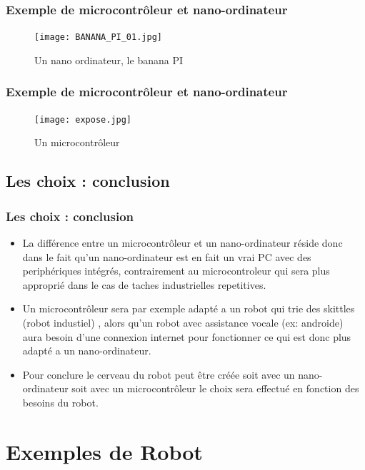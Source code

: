 \documentclass{beamer}
\begin{document}
\begin{frame}
\frametitle{Exemple de microcontrôleur et nano-ordinateur}
\begin{figure}[!h]
\centering
\texttt{[image: BANANA\_PI\_01.jpg]}
\caption{Un nano ordinateur, le banana PI}
\end{figure}
\end{frame}
\begin{frame}
\frametitle{Exemple de microcontrôleur et nano-ordinateur}
\begin{figure}[!h]
\centering
\texttt{[image: expose.jpg]}
\caption{Un microcontrôleur}
\end{figure}
\end{frame}
\subsection{Les choix : conclusion}
\begin{frame}
\frametitle{Les choix : conclusion}
\begin{itemize}
    \item La différence entre un microcontrôleur et un nano-ordinateur réside donc dans le fait qu'un nano-ordinateur est en fait un vrai PC avec  des periphériques intégrés, contrairement au microcontroleur qui sera plus approprié dans le cas de taches industrielles repetitives.
  \item Un microcontrôleur sera par exemple adapté a un robot qui trie des skittles (robot industiel) , alors qu'un robot avec assistance vocale (ex: androide) aura besoin d'une connexion internet pour fonctionner ce qui est donc plus adapté a un nano-ordinateur.
\item Pour conclure le cerveau du robot peut être créée soit avec un nano-ordinateur soit avec un microcontrôleur le choix sera effectué en fonction des besoins du robot.
\end{itemize}
\end{frame}

\section{Exemples de Robot}
\end{document}
